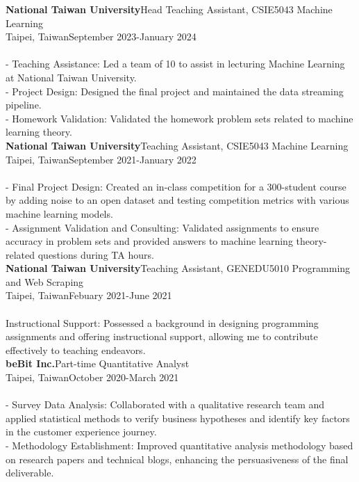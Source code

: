 \documentclass{article}
\begin{document}
\noindent\textbf{National Taiwan University}\hfill Head Teaching Assistant, CSIE5043 Machine Learning\\
Taipei, Taiwan\hfill September 2023-January 2024\\\\
- Teaching Assistance: Led a team of 10 to assist in lecturing Machine Learning at National Taiwan University.\\ - Project Design: Designed the final project and maintained the data streaming pipeline.\\ - Homework Validation: Validated the homework problem sets related to machine learning theory.\\

\noindent\textbf{National Taiwan University}\hfill Teaching Assistant, CSIE5043 Machine Learning\\
Taipei, Taiwan\hfill September 2021-January 2022\\\\
- Final Project Design: Created an in-class competition for a 300-student course by adding noise to an open dataset and testing competition metrics with various machine learning models.\\ - Assignment Validation and Consulting: Validated assignments to ensure accuracy in problem sets and provided answers to machine learning theory-related questions during TA hours.\\

\noindent\textbf{National Taiwan University}\hfill Teaching Assistant, GENEDU5010 Programming and Web Scraping\\
Taipei, Taiwan\hfill Febuary 2021-June 2021\\\\
Instructional Support: Possessed a background in designing programming assignments and offering instructional support, allowing me to contribute effectively to teaching endeavors.\\

\noindent\textbf{beBit Inc.}\hfill Part-time Quantitative Analyst\\
Taipei, Taiwan\hfill October 2020-March 2021\\\\
- Survey Data Analysis: Collaborated with a qualitative research team and applied statistical methods to verify business hypotheses and identify key factors in the customer experience journey.\\ - Methodology Establishment: Improved quantitative analysis methodology based on research papers and technical blogs, enhancing the persuasiveness of the final deliverable.\\
\end{document}
